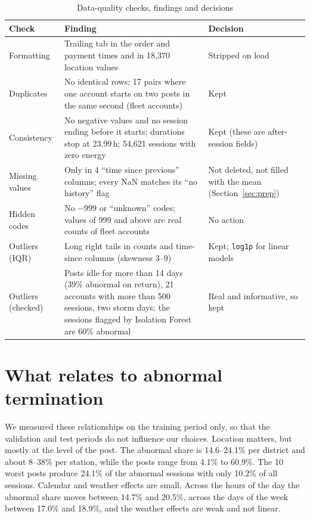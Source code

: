 \documentclass[12pt,a4paper,openany]{report}
\begin{document}
\begin{table}[!htb]
  \centering\small
  \caption{Data-quality checks, findings and decisions}
  \label{tab:quality}
  \begin{tabularx}{\textwidth}{>{\raggedright\arraybackslash}p{2.3cm}LL}
    \toprule
    Check & Finding & Decision \\
    \midrule
    Formatting & Trailing tab in the order and payment times and in 18,370 location values & Stripped on load \\
    \addlinespace[2pt]
    Duplicates & No identical rows; 17 pairs where one account starts on two posts in the same second (fleet accounts) & Kept \\
    \addlinespace[2pt]
    Consistency & No negative values and no session ending before it starts; durations stop at 23.99\,h; 54,621 sessions with zero energy & Kept (these are after-session fields) \\
    \addlinespace[2pt]
    Missing values & Only in 4 ``time since previous'' columns; every \acs{NaN} matches its ``no history'' flag & Not deleted, not filled with the mean (Section~\ref{sec:prep}) \\
    \addlinespace[2pt]
    Hidden codes & No $-999$ or ``unknown'' codes; values of 999 and above are real counts of fleet accounts & No action \\
    \addlinespace[2pt]
    Outliers (\acs{IQR}) & Long right tails in counts and time-since columns (skewness 3--9) & Kept; \texttt{log1p} for linear models \\
    \addlinespace[2pt]
    Outliers (checked) & Posts idle for more than 14 days (39\% abnormal on return), 21 accounts with more than 500 sessions, two storm days; the sessions flagged by Isolation Forest are 60\% abnormal & Real and informative, so kept \\
    \bottomrule
  \end{tabularx}
\end{table}

\section{What relates to abnormal termination}\label{sec:relations}

We measured these relationships on the training period only, so that the validation and test periods do not
influence our choices. Location matters, but mostly at the level of the post. The abnormal share is 14.6--24.1\% per district and about
8--38\% per station, while the posts range from 4.1\% to 60.9\%. The 10 worst posts produce 24.1\% of the
abnormal sessions with only 10.2\% of all sessions. Calendar and weather effects are small. Across the hours of
the day the abnormal share moves between 14.7\% and 20.5\%, across the days of the week between 17.0\% and
18.9\%, and the weather effects are weak and not linear.
\end{document}
